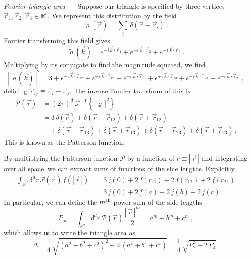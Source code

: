 \documentclass[10pt]{article}
\renewcommand{\paragraph}[1]{\par\addvspace{1em}\noindent\textsl{#1}~---}
\renewcommand{\d}{\mathrm{d}}
\newcommand{\abs}[1]{|\,{#1}\,|}
\begin{document}
\paragraph{Fourier triangle area}
Suppose our triangle is specified by three vertices $\vec{r}_1,\vec{r}_2,\vec{r}_3 \in \mathbb{R}^d$. We represent this distribution by the field
\begin{equation}
    \varrho(\vec{r})
    = \sum_i \, \delta(\vec{r} - \vec{r}_i)~.
\end{equation}
Fourier transforming this field gives
\begin{equation}
    \tilde{\varrho}(\vec{k})
    =
    e^{-i \, \vec{k} \cdot \vec{r}_1} +
    e^{-i \, \vec{k} \cdot \vec{r}_2} +
    e^{-i \, \vec{k} \cdot \vec{r}_3}~.
\end{equation}
Multiplying by its conjugate to find the magnitude squared, we find
\begin{equation}
    \abs{\tilde{\varrho}(\vec{k})}^2
    =
    3 +
    e^{-i \, \vec{k} \cdot \vec{r}_{12}} +
    e^{+i \, \vec{k} \cdot \vec{r}_{12}} +
    e^{-i \, \vec{k} \cdot \vec{r}_{13}} +
    e^{+i \, \vec{k} \cdot \vec{r}_{13}} +
    e^{-i \, \vec{k} \cdot \vec{r}_{23}} +
    e^{+i \, \vec{k} \cdot \vec{r}_{23}}~,
\end{equation}
defining $\vec{r}_{ij} \equiv \vec{r}_i - \vec{r}_j$.
The inverse Fourier transform of this is
\begin{align}
    \mathcal{P}(\vec{r})
    &= (2\pi)^d \, \mathcal{F}^{-1} \! \left\{ \abs{\tilde{\varrho}}^2 \right\}
    \nonumber\\ 
    &= 3 \,\delta(\vec{r})
    + \delta(\vec{r} - \vec{r}_{12})
    + \delta(\vec{r} + \vec{r}_{12})
    \nonumber\\
    &\quad + \delta(\vec{r} - \vec{r}_{13})
    + \delta(\vec{r} + \vec{r}_{13})
    + \delta(\vec{r} - \vec{r}_{23})
    + \delta(\vec{r} + \vec{r}_{23})~.
\end{align}
This is known as the Patterson function.

By multiplying the Patterson function $\mathcal{P}$ by a function of $r \equiv \abs{\vec{r}}$ and integrating over all space, we can extract sums of functions of the side lengths. Explicitly,
\begin{align}
    \int_{\mathbb{R}^d} \d^d r \, \mathcal{P}(\vec{r}) \, f(\abs{\vec{r}})
    &= 3 \, f(0) +
        2 \, f(r_{12}) +
        2 \, f(r_{13}) +
        2 \, f(r_{23}) \nonumber\\
    &= 3 \, f(0) +
        2 \, f(a) +
        2 \, f(b) +
        2 \, f(c)~.
\end{align}
In particular, we can define the $m^{\rm th}$ power sum of the side lengths
\begin{equation}
    P_m
    = \int_{\mathbb{R}^d} \d^d r \, \mathcal{P}(\vec{r}) \, \frac{\abs{\vec{r}}^m}{2}
    = a^m + b^m + c^m~,
\end{equation}
which allows us to write the triangle area as
\begin{equation}
    \Delta
    = \frac{1}{4} \, \sqrt{\left(a^2+b^2+c^2\right)^2 - 2\, \left(a^4+b^4+c^4\right)}
    = \frac{1}{4} \, \sqrt{P_2^2 - 2\, P_4}~.
\end{equation}
\end{document}

